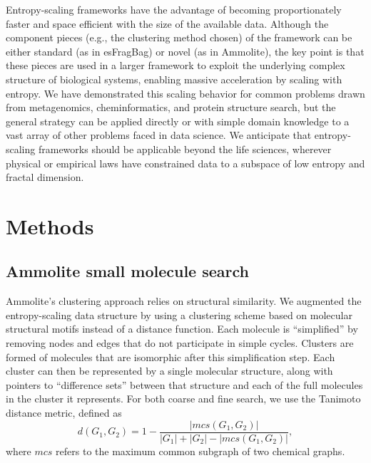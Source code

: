 \documentclass[review,preprint,12pt]{elsarticle}
\theoremstyle{definition}
\theoremstyle{remark}
\numberwithin{equation}{section}
\begin{document}
Entropy-scaling frameworks have the advantage of becoming proportionately faster and space efficient with the size of the available data.
Although the component pieces (e.g., the clustering method chosen) of the framework can be either standard (as in esFragBag) or novel (as in Ammolite), the key point is that these pieces are used in a larger framework to exploit the underlying complex structure of biological systems, enabling massive acceleration by scaling with entropy.
We have demonstrated this scaling behavior for common problems drawn from metagenomics, cheminformatics, and protein structure search, but the general strategy can be applied directly or with simple domain knowledge to a vast array of other problems faced in data science.
We anticipate that entropy-scaling frameworks should be applicable beyond the life sciences, wherever physical or empirical laws have constrained data to a subspace of low entropy and fractal dimension.

\section{Methods}

\subsection{Ammolite small molecule search}
Ammolite's clustering approach relies on structural similarity.
We augmented the entropy-scaling data structure by using a clustering scheme based on molecular structural motifs instead of a distance function.
Each molecule is ``simplified'' by removing nodes and edges that do not
participate in simple cycles.
Clusters are formed of molecules that are isomorphic after this simplification
step.
Each cluster can then be represented by a single molecular structure, along 
with pointers to ``difference sets''  between that structure and each of the 
full molecules in the cluster it represents.
For both coarse and fine search, we use the Tanimoto distance metric, defined as
\[d(G_1,G_2) = 1 - \frac{ |mcs(G_1,G_2)| }{|G_1|+|G_2|-|mcs(G_1,G_2)|},\]
where $mcs$ refers to the maximum common subgraph of two chemical graphs. 
\end{document}
